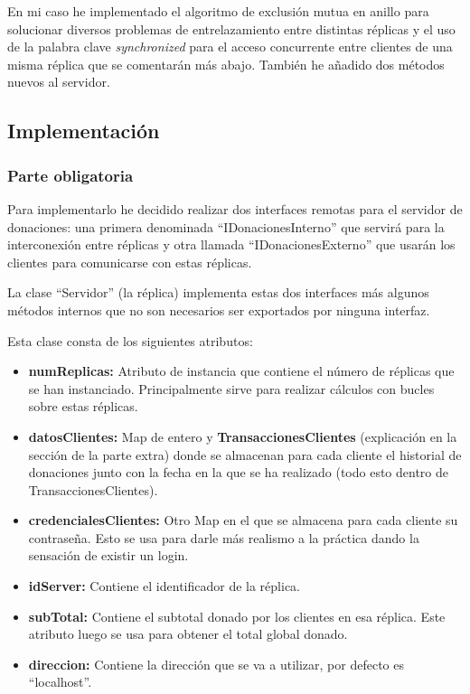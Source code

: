 \documentclass{article}
\begin{document}
En mi caso he implementado el algoritmo de exclusión mutua en anillo para solucionar diversos problemas de entrelazamiento entre distintas réplicas y el uso de la palabra clave \textit{synchronized} para el acceso concurrente entre clientes de una misma réplica que se comentarán más abajo. También he añadido dos métodos nuevos al servidor.
\subsection{Implementación}
\subsubsection{Parte obligatoria}

Para implementarlo he decidido realizar dos interfaces remotas para el servidor de donaciones: una primera denominada ``IDonacionesInterno'' que servirá para la interconexión entre réplicas y otra llamada ``IDonacionesExterno'' que usarán los clientes para comunicarse con estas réplicas.


La clase ``Servidor'' (la réplica) implementa estas dos interfaces más algunos métodos internos que no son necesarios ser exportados por ninguna interfaz.


Esta clase consta de los siguientes atributos:
\begin{itemize}
    \item \textbf{numReplicas: }Atributo de instancia que contiene el número de réplicas que se han instanciado. Principalmente sirve para realizar cálculos con bucles sobre estas réplicas.
    
    \item \textbf{datosClientes: }Map de entero y \textbf{TransaccionesClientes} (explicación en la sección de la parte extra) donde se almacenan para cada cliente el historial de donaciones junto con la fecha en la que se ha realizado (todo esto dentro de TransaccionesClientes).
    \item \textbf{credencialesClientes: }Otro Map en el que se almacena para cada cliente su contraseña. Esto se usa para darle más realismo a la práctica dando la sensación de existir un login.
    \item \textbf{idServer: }Contiene el identificador de la réplica.
    \item \textbf{subTotal: }Contiene el subtotal donado por los clientes en esa réplica. Este atributo luego se usa para obtener el total global donado. 
    \item \textbf{direccion: }Contiene la dirección que se va a utilizar, por defecto es ``localhost''.
\end{itemize}
\end{document}
